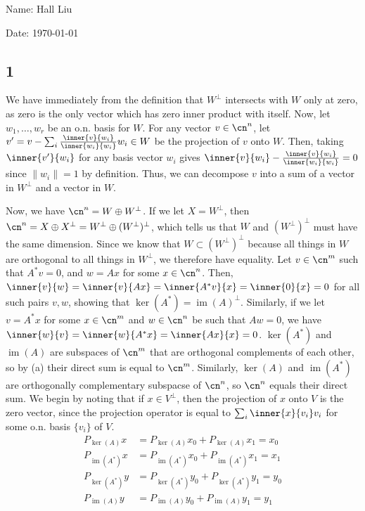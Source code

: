 \documentclass{article}
\DeclareMathOperator{\im}{im}
\begin{document}
Name: Hall Liu

Date: \today 
\vspace{1.5cm}
\subsection*{1}
We have immediately from the definition that $W^\perp$ intersects with $W$ only at zero, as zero is the only vector which has zero inner product with itself. Now, let $w_1,\ldots,w_r$ be an o.n. basis for $W$. For any vector $v\in\cn^n$, let $v'=v-\sum_i\frac{\inner{v}{w_i}}{\inner{w_i}{w_i}}w_i\in W$ be the projection of $v$ onto $W$. Then, taking $\inner{v'}{w_i}$ for any basis vector $w_i$ gives
$\inner{v}{w_i}-\frac{\inner{v}{w_i}}{\inner{w_i}{w_i}}=0$ since $\|w_i\|=1$ by definition. Thus, we can decompose $v$ into a sum of a vector in $W^\perp$ and a vector in $W$.

Now, we have $\cn^n=W\oplus W^\perp$. If we let $X=W^\perp$, then $\cn^n=X\oplus X^\perp=W^\perp\oplus(W^\perp)^\perp$, which tells us that $W$ and $(W^\perp)^\perp$ must have the same dimension. Since we know that $W\subset (W^\perp)^\perp$ because all things in $W$ are orthogonal to all things in $W^\perp$, we therefore have equality.
Let $v\in\cn^m$ such that $A^*v=0$, and $w=Ax$ for some $x\in\cn^n$. Then, $\inner{v}{w}=\inner{v}{Ax}=\inner{A^*v}{x}=\inner{0}{x}=0$ for all such pairs $v,w$, showing that $\ker(A^*)=\im(A)^\perp$. Similarly, if we let $v=A^*x$ for some $x\in\cn^m$ and $w\in\cn^n$ be such that $Aw=0$, we have $\inner{w}{v}=\inner{w}{A^*x}=\inner{Ax}{x}=0$.
$\ker(A^*)$ and $\im(A)$ are subspaces of $\cn^m$ that are orthogonal complements of each other, so by (a) their direct sum is equal to $\cn^m$. Similarly, $\ker(A)$ and $\im(A^*)$ are orthogonally complementary subspacse of $\cn^n$, so $\cn^n$ equals their direct sum.
We begin by noting that if $x\in V^\perp$, then the projection of $x$ onto $V$ is the zero vector, since the projection operator is equal to $\sum_i\inner{x}{v_i}v_i$ for some o.n. basis $\{v_i\}$ of $V$.
\begin{align*}
    P_{\ker(A)}x&=P_{\ker(A)}x_0+P_{\ker(A)}x_1=x_0\\
    P_{\im(A^*)}x&=P_{\im(A^*)}x_0+P_{\im(A^*)}x_1=x_1\\
    P_{\ker(A^*)}y&=P_{\ker(A^*)}y_0+P_{\ker(A^*)}y_1=y_0\\
    P_{\im(A)}y&=P_{\im(A)}y_0+P_{\im(A)}y_1=y_1\\
\end{align*}
\end{document}
